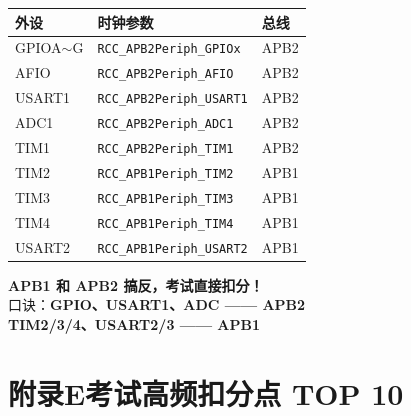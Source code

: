 \documentclass[10pt,a4paper,oneside]{ctexart}
\newcommand{\danger}[1]{\textcolor{accent}{\textbf{#1}}}
\begin{document}
\begin{center}
\begin{tabular}{@{}lll@{}}
    \toprule
    \textbf{外设} & \textbf{时钟参数} & \textbf{总线} \\
    \midrule
    GPIOA$\sim$G  & \texttt{RCC\_APB2Periph\_GPIOx} & APB2 \\
    AFIO         & \texttt{RCC\_APB2Periph\_AFIO}   & APB2 \\
    USART1       & \texttt{RCC\_APB2Periph\_USART1} & APB2 \\
    ADC1         & \texttt{RCC\_APB2Periph\_ADC1}  & APB2 \\
    TIM1         & \texttt{RCC\_APB2Periph\_TIM1}  & APB2 \\
    TIM2         & \texttt{RCC\_APB1Periph\_TIM2}  & APB1 \\
    TIM3         & \texttt{RCC\_APB1Periph\_TIM3}  & APB1 \\
    TIM4         & \texttt{RCC\_APB1Periph\_TIM4}  & APB1 \\
    USART2       & \texttt{RCC\_APB1Periph\_USART2} & APB1 \\
    \bottomrule
\end{tabular}
\end{center}

\begin{warnbox}
    \danger{APB1 和 APB2 搞反，考试直接扣分！}\\
    口诀：\textbf{GPIO、USART1、ADC —— APB2}\\
    \phantom{口诀：}\textbf{TIM2/3/4、USART2/3 —— APB1}
\end{warnbox}

\section*{附录E\quad 考试高频扣分点 TOP 10}
\end{document}
